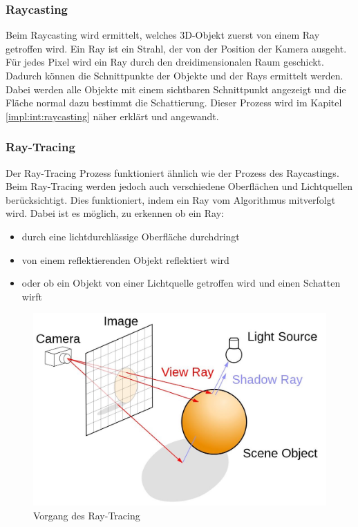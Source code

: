 \subsubsection{Raycasting}
\label{impl:rend:raycasting}
Beim Raycasting wird ermittelt, welches 3D-Objekt zuerst von einem Ray getroffen wird. Ein Ray ist ein Strahl, der von der Position der Kamera ausgeht. Für jedes Pixel wird ein Ray durch den dreidimensionalen Raum geschickt. Dadurch können die Schnittpunkte der Objekte und der Rays ermittelt werden. Dabei werden alle Objekte mit einem sichtbaren Schnittpunkt angezeigt und die Fläche normal dazu bestimmt die Schattierung. Dieser Prozess wird im Kapitel \ref{impl:int:raycasting} näher erklärt und angewandt.
\cite{Rendering3DModels} 

\subsubsection{Ray-Tracing}
Der Ray-Tracing Prozess funktioniert ähnlich wie der Prozess des Raycastings. Beim Ray-Tracing werden jedoch auch verschiedene Oberflächen und Lichtquellen berücksichtigt. Dies funktioniert, indem ein Ray vom Algorithmus mitverfolgt wird. Dabei ist es möglich, zu erkennen ob ein Ray:
\begin{itemize}
    \item durch eine lichtdurchlässige Oberfläche durchdringt
    \item von einem reflektierenden Objekt reflektiert wird
    \item oder ob ein Objekt von einer Lichtquelle getroffen wird und einen Schatten wirft
\end{itemize}
\cite{RayTracingRasterization}

\begin{figure} [h]
    \centering
    \includegraphics[scale=0.3]{pics/ray-tracing.jpg}
    \caption{Vorgang des Ray-Tracing \cite{RayTracingRasterization}}
    \label{fig:impl:ray-tracing}
\end{figure}


